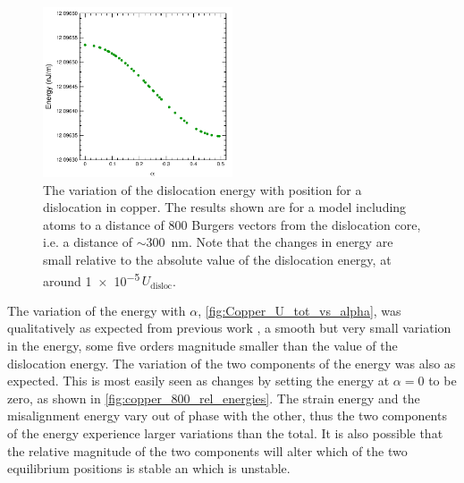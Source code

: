 \begin{figure}
\centering
\includegraphics[width=0.5\textwidth]{Copper_800_U_tot}
\caption[Energy variation of a dislocation in copper with the dislocation position.]{The variation of the dislocation energy with position for a dislocation in copper. The results shown are for a model including atoms to a distance of 800 Burgers vectors from the dislocation core, i.e. a distance of $\sim$\SI{300}{\nano\metre}.  Note that the changes in energy are small relative to the absolute value of the dislocation energy, at around \num{1e-5}\,$U_{\text{disloc}}$.\label{fig:Copper_U_tot_vs_alpha}}
\end{figure}

The variation of the energy with $\alpha$, \autoref{fig:Copper_U_tot_vs_alpha}, was qualitatively as expected from previous work \cite{Bulatov1997,Clegg2006}, a smooth but very small variation in the energy, some five orders magnitude smaller than the value of the dislocation energy. The variation of the two components of the energy was also as expected. This is most easily seen as changes by setting the energy at $\alpha=0$ to be zero, as shown in \autoref{fig:copper_800_rel_energies}. The strain energy and the misalignment energy vary out of phase with the other, thus the two components of the energy experience larger variations than the total. It is also possible that the relative magnitude of the two components will alter which of the two equilibrium positions is stable an which is unstable.


